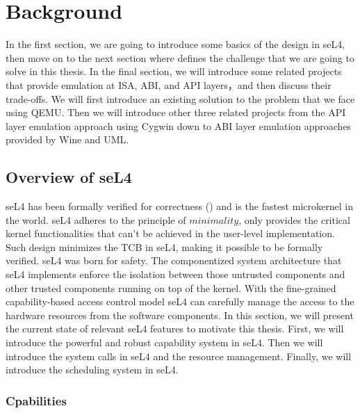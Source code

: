 \chapter{Background}\label{ch:background}

In the first section, we are going to introduce some basics of the design in seL4, then move on to the next section where defines the challenge that we are going to solve in this thesis. In the final section, we will introduce some related projects that provide emulation at ISA, ABI, and API layers，and then discuss their trade-offs. We will first introduce an existing solution to the problem that we face using QEMU. Then we will introduce other three related projects from the API layer emulation approach using Cygwin down to ABI layer emulation approaches provided by Wine and UML.      

\vspace*{-\dimexpr1.0ex+0.1\baselineskip\relax}

\section{Overview of seL4}

seL4 has been formally verified for correctness (\cite{Klein_EHACDEEKNSTW_09}) and is the fastest microkernel in the world. seL4 adheres to the principle of $minimality$, only provides the critical kernel functionalities that can't be achieved in the user-level implementation. Such design minimizes the TCB in seL4, making it possible to be formally verified. seL4 was born for safety. The componentized system architecture that seL4 implements enforce the isolation between those untrusted components and other trusted components running on top of the kernel. With the fine-grained capability-based access control model seL4 can carefully manage the access to the hardware resources from the software components. In this section, we will present the current state of relevant seL4 features to motivate this thesis. First, we will introduce the powerful and robust capability system in seL4. Then we will introduce the system calls in seL4 and the resource management. Finally, we will introduce the scheduling system in seL4.


\subsection{Cpabilities}

